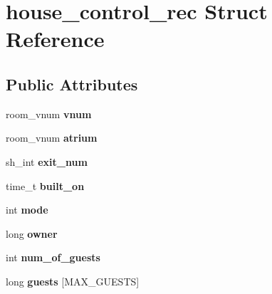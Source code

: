 \hypertarget{structhouse__control__rec}{}\section{house\+\_\+control\+\_\+rec Struct Reference}
\label{structhouse__control__rec}
\subsection*{Public Attributes}
\begin{DoxyCompactItemize}
\item 
\mbox{\label{structhouse__control__rec_a66430abbe14195c8de3c96b305e4f97b}} 
room\+\_\+vnum {\bfseries vnum}
\item 
\mbox{\label{structhouse__control__rec_a9e6c8fd16435129d8374430ad19c52d6}} 
room\+\_\+vnum {\bfseries atrium}
\item 
\mbox{\label{structhouse__control__rec_a6cf7e65e03bdff83921231a8984936b3}} 
sh\+\_\+int {\bfseries exit\+\_\+num}
\item 
\mbox{\label{structhouse__control__rec_aed68b49d619018d3de86ef8e32ceb5eb}} 
time\+\_\+t {\bfseries built\+\_\+on}
\item 
\mbox{\label{structhouse__control__rec_a2d546922b3681cbb6967b0514c8970df}} 
int {\bfseries mode}
\item 
\mbox{\label{structhouse__control__rec_a5cf85f9761eb0d21c860519827f9bbc9}} 
long {\bfseries owner}
\item 
\mbox{\label{structhouse__control__rec_a785f2d9f0bb39e336bb4744d246ac47f}} 
int {\bfseries num\+\_\+of\+\_\+guests}
\item 
\mbox{\label{structhouse__control__rec_ac5418398e09cdb43e11b78e459f74153}} 
long {\bfseries guests} \mbox{[}M\+A\+X\+\_\+\+G\+U\+E\+S\+TS\mbox{]}
\item 
\mbox{\label{structhouse__control__rec_a8037f040fca9262e53f15b2d4f7fbae2}} 

\end{DoxyCompactItemize}
